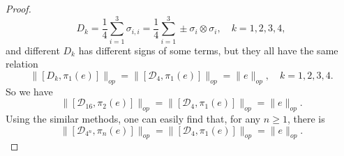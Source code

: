 \documentclass[10pt,a4paper]{amsart}
\begin{document}
\begin{proof}
\begin{equation}
	D_k = \frac{1}{4}  \sum_{i = 1}^3 \sigma_{i, i} = \frac{1}{4}  \sum_{i =
		1}^3 \pm \sigma_i \otimes \sigma_i, \quad k = 1, 2, 3, 4,
\end{equation}
and different $D_k$ has different signs of some terms, but they all have the
same relation
\begin{equation}
	\|[D_k, \pi_1 (e)]\|_{op} =\|[\mathcal{D}_4, \pi_1 (e)]\|_{op}= \|e\|_{op}, \quad k = 1, 2, 3, 4 .
\end{equation}
So we have
\begin{equation}
	\|[\mathcal{D}_{16}, \pi_2 (e)]\|_{op} = \|[\mathcal{D}_4, \pi_1 (e)]\|_{op}
	= \|e\|_{op} . 
\end{equation}
Using the similar methods, one can easily find that, for any $n \geqslant 1$, there is
\begin{equation}
	\|[\mathcal{D}_{4^n}, \pi_n (e)]\|_{op} = \|[\mathcal{D}_4, \pi_1 (e)]\|_{op}
	= \|e\|_{op} .
\end{equation}
\end{proof}
\end{document}
